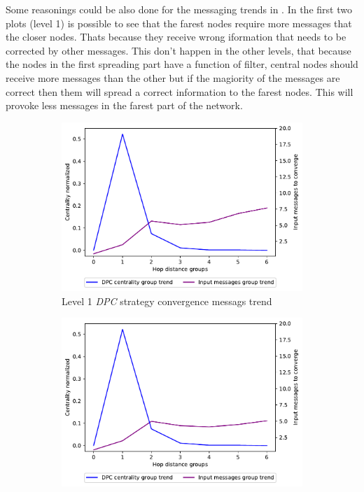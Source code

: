 \documentclass[10pt,conference,letterpaper]{IEEEtran}
\newcommand{\figwidth}{0.78}
\begin{document}
Some reasonings could be also done for the messaging trends in .
In the first two plots (level 1) is possible to see that the farest nodes require
more messages that the closer nodes.
Thats because they receive wrong iformation that needs to be corrected by other
messages.
This don't happen in the other levels, that because the nodes in the 
first spreading part have a function of filter, central nodes should
receive more messages than the other but if the magiority of the messages
are correct then them will spread a correct information to the farest nodes.
This will provoke less messages in the farest part of the network.

\begin{figure}[tb]
	\centering

	\begin{subfigure}{.49\columnwidth}
		\centering
		\includegraphics[width=\figwidth\columnwidth]{images/different_levels/1000-DPC-l0_node-conv_MRAI30_centVSmsg_trend.pdf}
		\caption{Level 1 \textit{DPC} strategy convergence messags trend}
		\label{fig:1000-dpc-msg-trend-level1}
	\end{subfigure}
	\hfill
	\begin{subfigure}{.49\columnwidth}
		\centering
		\includegraphics[width=\figwidth\columnwidth]{images/different_levels/1000-reverse_dpc-l0_node-conv_MRAI30_centVSmsg_trend.pdf}

\end{subfigure}
\end{figure}
\end{document}
